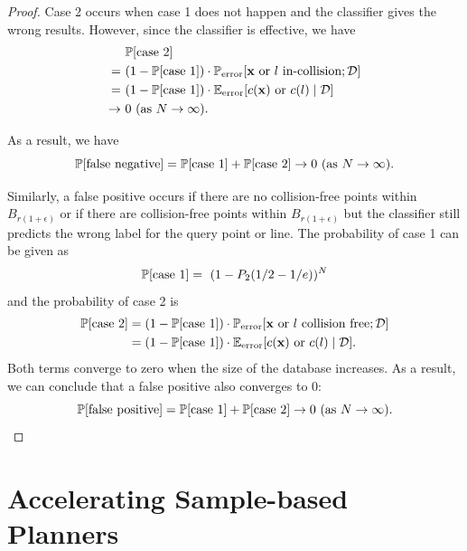 \begin{proof}
Case 2 occurs when case 1 does not happen and the classifier gives the wrong results. However, since the classifier is effective, we have
\begin{align}
  &\ \mathbb P[\text{case 2}] \notag \\
 =& \ (1 - \mathbb P[\text{case 1}])\cdot \mathbb P_{\text{error}}[\mathbf x \text{ or } l \text{ in-collision}; \mathcal D] \notag \\
 =& \ (1 - \mathbb P[\text{case 1}])\cdot \mathbb E_{\text{error}}[c(\mathbf x) \text{ or } c(l) \mid \mathcal D] \notag \\
 \rightarrow &\ 0 \ (\text{as } N \rightarrow \infty). \notag
\end{align}

As a result, we have
\begin{equation}
\mathbb P[\text{false negative}] = \mathbb P[\text{case 1}] + \mathbb P[\text{case 2}] \rightarrow 0 \ (\text{as } N \rightarrow \infty) \notag.
\end{equation}

Similarly, a false positive occurs if there are no collision-free points within $B_{r(1+\epsilon)}$ or if there are collision-free points within $B_{r(1+\epsilon)}$ but the classifier still predicts the wrong label for the query point or line. The probability of case 1 can be given as
\begin{equation}
\mathbb P[\text{case 1}] = \ (1-P_2(1/2-1/e))^N \notag
\end{equation}
and the probability of case 2 is
\begin{align}
\mathbb P[\text{case 2}] &= (1 - \mathbb P[\text{case 1}]) \cdot \mathbb P_{\text{error}} [\mathbf x \text{ or } l \text{ collision free}; \mathcal D] \notag \\
 &= (1 - \mathbb P[\text{case 1}])\cdot \mathbb E_{\text{error}}[c(\mathbf x) \text{ or } c(l) \mid \mathcal D]. \notag \\
\end{align}
Both terms converge to zero when the size of the database increases. As a result, we can conclude that a false positive also converges to $0$:
\begin{equation}
\mathbb P[\text{false positive}] = \mathbb P[\text{case 1}] + \mathbb P[\text{case 2}]\rightarrow 0 \ (\text{as } N \rightarrow \infty). \notag
\end{equation}
\end{proof}


\section{Accelerating Sample-based Planners}
\label{sec:3:planners}

